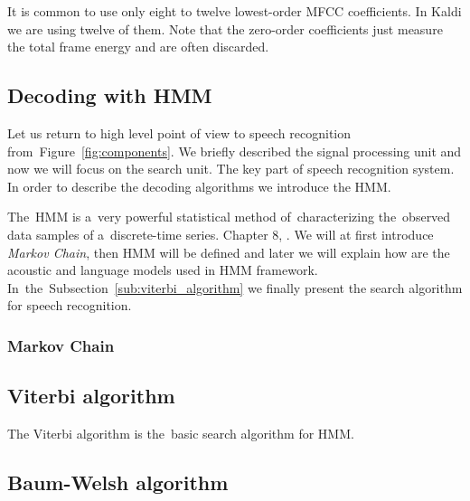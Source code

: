 It is common to use only eight to twelve lowest-order \ac{MFCC} coefficients. In Kaldi we are using twelve of them.
Note that the zero-order coefficients just measure the total frame energy and are often discarded.


\subsection{Decoding with \ac{HMM}}
\label{sub:decoding_with_hmm}
Let us return to high level point of view to speech recognition from~Figure~\ref{fig:components}.
We briefly described the signal processing unit and now we will focus on the search unit. The key part of speech recognition system.
In order to describe the decoding algorithms we introduce the \acl{HMM}. 

The~\acl{HMM} is a~very powerful statistical method of~characterizing the~observed data samples of a~discrete-time series. Chapter 8, \cite{huang2001spoken}.
We will at first introduce {\it Markov Chain}, then \ac{HMM} will be defined and later we will explain how are the acoustic and language models used in \ac{HMM} framework. In~the~Subsection~\ref{sub:viterbi_algorithm} we finally present the search algorithm for speech recognition.

\subsubsection*{Markov Chain}
\label{ssub:markov_chain}




\subsection*{Viterbi algorithm}
\label{sub:viterbi_algorithm}
The Viterbi algorithm is the~basic search algorithm for \ac{HMM}. 



\subsection{Baum-Welsh algorithm}
\label{sub:baum_welsh_algorithm}





